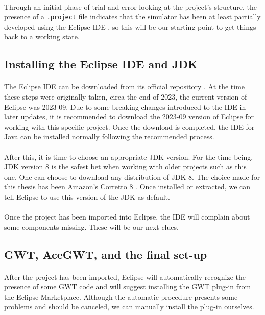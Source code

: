 \paragraph{}
Through an initial phase of trial and error looking at the project's structure, the presence of a \verb|.project| file indicates that the simulator has been at least partially developed using the Eclipse IDE \cite{web:eclipse}, so this will be our starting point to get things back to a working state.
\subsection{Installing the Eclipse IDE and JDK}
\paragraph{}
The Eclipse IDE can be downloaded from its official repository \cite{web:eclipse}. At the time these steps were originally taken, circa the end of 2023, the current version of Eclipse was 2023-09. Due to some breaking changes introduced to the IDE in later updates, it is recommended to download the 2023-09 version of Eclipse for working with this specific project. Once the download is completed, the IDE for Java can be installed normally following the recommended process.
\paragraph{}
After this, it is time to choose an appropriate JDK version. For the time being, JDK version 8 is the safest bet when working with older projects such as this one. One can choose to download any distribution of JDK 8. The choice made for this thesis has been Amazon's Corretto 8 \cite{web:amazoncorretto8}. Once installed or extracted, we can tell Eclipse to use this version of the JDK as default.
\paragraph{}
Once the project has been imported into Eclipse, the IDE will complain about some components missing. These will be our next clues.
\subsection{GWT, AceGWT, and the final set-up}
\paragraph{}
After the project has been imported, Eclipse will automatically recognize the presence of some GWT code and will suggest installing the GWT plug-in \cite{web:eclipsegwtplugin} from the Eclipse Marketplace. Although the automatic procedure presents some problems and should be canceled, we can manually install the plug-in ourselves.
